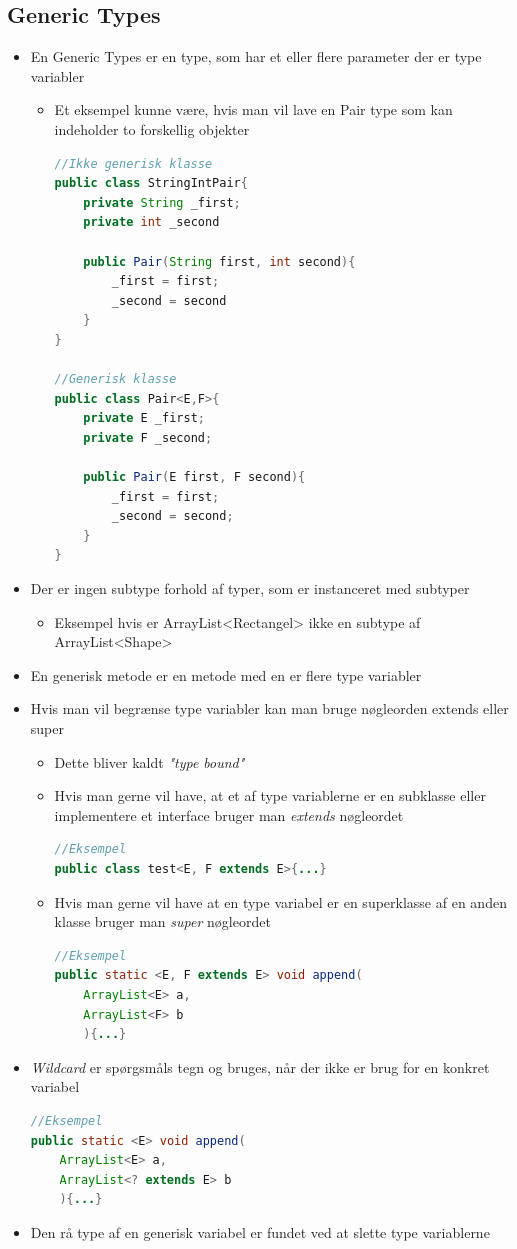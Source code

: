 \documentclass{article}
\begin{document}
\subsection{Generic Types}
\begin{itemize}
	\item En Generic Types er en type, som har et eller flere parameter der er type variabler
	\begin{itemize}
		\item Et eksempel kunne være, hvis man vil lave en Pair type som kan indeholder to forskellig objekter
\begin{lstlisting}[language=java]
//Ikke generisk klasse
public class StringIntPair{
	private String _first;
	private int _second
	
	public Pair(String first, int second){
		_first = first;
		_second = second
	}
}

//Generisk klasse
public class Pair<E,F>{
	private E _first;
	private F _second;
	
	public Pair(E first, F second){
		_first = first;
		_second = second; 
	}
}
\end{lstlisting}
	\end{itemize} 
	\item Der er ingen subtype forhold af typer, som er instanceret med subtyper
	\begin{itemize}
		\item Eksempel hvis er ArrayList<Rectangel> ikke en subtype af ArrayList<Shape>
	\end{itemize}
	\item En generisk metode er en metode med en er flere type variabler
	\item Hvis man vil begrænse type variabler kan man bruge nøgleorden extends eller super
	\begin{itemize}
		\item Dette bliver kaldt \textit{"type bound"} 
		\item Hvis man gerne vil have, at et af type variablerne er en subklasse eller implementere et interface bruger man \textit{extends} nøgleordet
\begin{lstlisting}[language=java]
//Eksempel
public class test<E, F extends E>{...}
\end{lstlisting}		
		\item Hvis man gerne vil have at en type variabel er en superklasse af en anden klasse bruger man \textit{super} nøgleordet
\begin{lstlisting}[language=java]
//Eksempel
public static <E, F extends E> void append(
	ArrayList<E> a, 
	ArrayList<F> b
	){...}
\end{lstlisting}
	\end{itemize}
	\item \textit{Wildcard} er spørgsmåls tegn og bruges, når der ikke er brug for en konkret variabel
\begin{lstlisting}[language=java]
//Eksempel
public static <E> void append(
	ArrayList<E> a, 
	ArrayList<? extends E> b
	){...}
\end{lstlisting}	
	\item Den rå type af en generisk variabel er fundet ved at slette type variablerne
\end{itemize}
\end{document}
